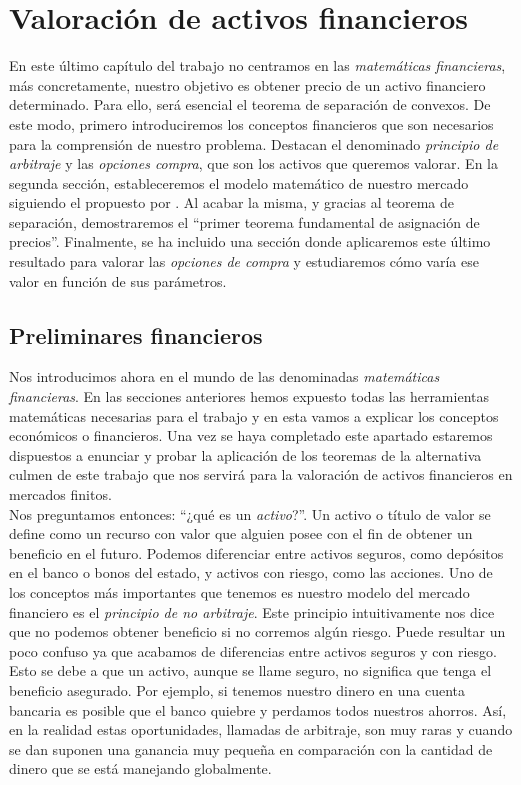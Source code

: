 \chapter{Valoración de activos financieros}
En este último capítulo del trabajo no centramos en las \textit{matemáticas financieras}, más concretamente, nuestro objetivo es obtener precio de un activo financiero determinado. Para ello, será esencial el teorema de separación de convexos. De este modo, primero introduciremos los conceptos financieros que son necesarios para la comprensión de nuestro problema. Destacan el denominado \textit{principio de arbitraje} y las \textit{opciones compra}, que son los activos que queremos valorar. En la segunda sección, estableceremos el modelo matemático de nuestro mercado siguiendo el propuesto por \cite{elliot1999mathematics}. Al acabar la misma, y gracias al teorema de separación, demostraremos el ``primer teorema fundamental de asignación de precios''. Finalmente, se ha incluido una sección donde aplicaremos este último resultado para valorar las \textit{opciones de compra} y estudiaremos cómo varía ese valor en función de sus parámetros.

\section{Preliminares financieros}
Nos introducimos ahora en el mundo de las denominadas \textit{matemáticas financieras}. En las secciones anteriores hemos expuesto todas las herramientas matemáticas necesarias para el trabajo y en esta vamos a explicar los conceptos económicos o financieros. Una vez se haya completado este apartado estaremos dispuestos a enunciar y probar la aplicación de los teoremas de la alternativa culmen de este trabajo que nos servirá para la valoración de activos financieros en mercados finitos. \\

Nos preguntamos entonces: ``¿qué es un \textit{activo}?''. Un activo o título de valor se define como un recurso con valor que alguien posee con el fin de obtener un beneficio en el futuro. Podemos diferenciar entre activos seguros, como depósitos en el banco o bonos del estado, y activos con riesgo, como las acciones. Uno de los conceptos más importantes que tenemos es nuestro modelo del mercado financiero es el \textit{principio de no arbitraje}. Este principio intuitivamente nos dice que no podemos obtener beneficio si no corremos algún riesgo. Puede resultar un poco confuso ya que acabamos de diferencias entre activos seguros y con riesgo. Esto se debe a que un activo, aunque se llame seguro, no significa que tenga el  beneficio asegurado. Por ejemplo, si tenemos nuestro dinero en una cuenta bancaria es posible que el banco quiebre y perdamos todos nuestros ahorros. Así, en la realidad estas oportunidades, llamadas de arbitraje, son muy raras y cuando se dan suponen una ganancia muy pequeña en comparación con la cantidad de dinero que se está manejando globalmente.\\

